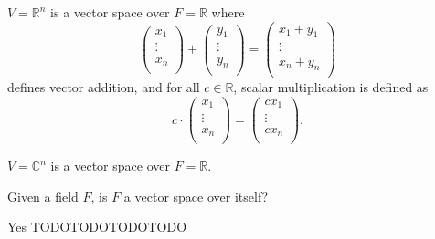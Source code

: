 \begin{eg}
    \(V=\mathbb{R}^n \) is a vector space over \(F=\mathbb{R} \) where
    \[
        \begin{pmatrix}
            x_1 \\
            \vdots \\
            x_n \\
       \end{pmatrix} + \begin{pmatrix}
            y_1 \\
            \vdots \\
            y_n \\
       \end{pmatrix} = \begin{pmatrix}
            x_1 + y _1 \\
            \vdots \\
            x_n + y_n \\
       \end{pmatrix}
    \]
    defines vector addition, and for all \(c \in \mathbb{R} \), scalar multiplication is defined as
    \[
        c \cdot \begin{pmatrix}
            x_1 \\
            \vdots \\
            x_n \\
       \end{pmatrix} = \begin{pmatrix}
            cx_1 \\
            \vdots \\
            cx_n \\
       \end{pmatrix}.
    \]
\end{eg}
\begin{eg}
    \(V=\mathbb{C} ^n\) is a vector space over \(F=\mathbb{R} \).
\end{eg}
\begin{question}
    Given a field \(F\), is \(F\) a vector space over itself? 
\end{question}
\begin{explanation}
    Yes TODOTODOTODOTODO
\end{explanation}
